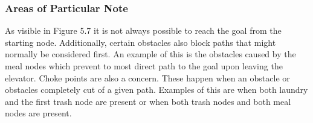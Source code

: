   \subsubsection{ Areas of Particular Note }

  As visible in Figure 5.7 it is not always possible to reach the goal from the
  starting node. Additionally, certain obstacles also block paths that might
  normally be considered first. An example of this is the obstacles caused by
  the meal nodes which prevent to most direct path to the goal upon leaving
  the elevator. Choke points are also a concern. These happen when an obstacle
  or obstacles completely cut of a given path. Examples of this are when both
  laundry and the first trash node are present or when both trash nodes and both
  meal nodes are present.


